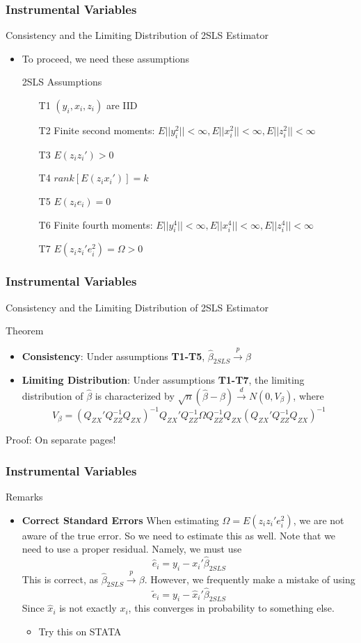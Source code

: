 \documentclass{beamer}
\begin{document}
\begin{frame}
\frametitle{Instrumental Variables}
Consistency and the Limiting Distribution of 2SLS Estimator
\begin{itemize}
\item  To proceed, we need these assumptions
\begin{block}{2SLS Assumptions}
\begin{itemize}
\item[T1] $(y_i, x_i, z_i)$ are IID
\item[T2] Finite second moments: $E||y_i^2||<\infty, E||x_i^2||<\infty, E||z_i^2||<\infty$
\item[T3] $E(z_iz_i')>0$
\item[T4] $rank[E(z_ix_i')]=k$
\item[T5] $E(z_ie_i)=0$
\item[T6] Finite fourth moments: $E||y_i^4||<\infty, E||x_i^4||<\infty, E||z_i^4||<\infty$
\item[T7] $E(z_iz_i'e_i^2)=\Omega>0$
\end{itemize}
\end{block}
\end{itemize}
\end{frame}

\begin{frame}
\frametitle{Instrumental Variables}
Consistency and the Limiting Distribution of 2SLS Estimator
\begin{block}{Theorem}
\begin{itemize}
\item \textbf{Consistency}: Under assumptions \textbf{T1-T5}, $\hat{\beta}_{2SLS}\xrightarrow{p}\beta$
\item \textbf{Limiting Distribution}: Under assumptions \textbf{T1-T7}, the limiting distribution of $\hat{\beta}$ is characterized by $\sqrt{n}(\hat{\beta}-\beta)\xrightarrow{d}N(0,V_\beta)$, where 
\[
V_\beta= (Q_{ZX}'Q_{ZZ}^{-1}Q_{ZX})^{-1}Q_{ZX}'Q_{ZZ}^{-1}\Omega Q_{ZZ}^{-1}Q_{ZX}(Q_{ZX}'Q_{ZZ}^{-1}Q_{ZX})^{-1}
\]
\end{itemize}
\end{block}
Proof: On separate pages!
\end{frame}

\begin{frame}
\frametitle{Instrumental Variables}
Remarks
\begin{itemize}
\item \textbf{Correct Standard Errors} When estimating $\Omega=E(z_iz_i'e_i^2)$, we are not aware of the true error. So we need to estimate this as well. Note that we need to use a proper residual. Namely, we must use
\[
\hat{e}_i = y_i - x_i'\hat{\beta}_{2SLS}
\]
This is correct, as $\hat{\beta}_{2SLS}\xrightarrow{p}\beta$. However, we frequently make a mistake of using
\[
\tilde{e}_i = y_i - \hat{x}_i'\hat{\beta}_{2SLS}
\]
Since $\hat{x}_i$ is not exactly $x_i$, this converges in probability to something else. 
\begin{itemize}
\item Try this on STATA
\end{itemize}
\end{itemize}
\end{frame}
\end{document}
